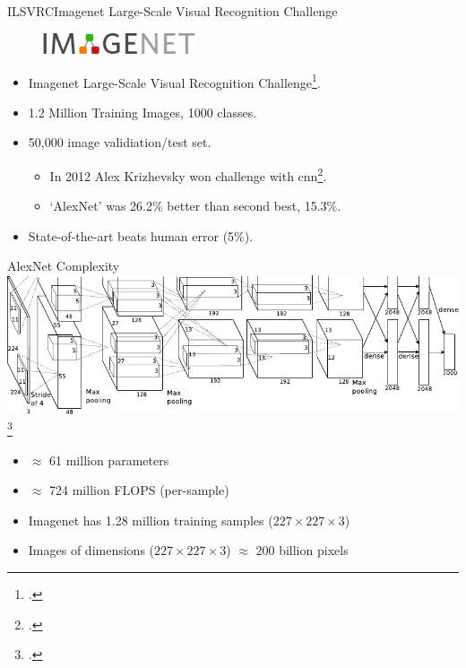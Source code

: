 \documentclass[t,xcolor=dvipsnames]{beamer}
\begin{document}
\begin{frame}{ILSVRC}{Imagenet Large-Scale Visual Recognition Challenge}

\begin{figure}
    \includegraphics[width=0.4\textwidth]{imagenetlogo}
\end{figure}
\begin{itemize}
    \item Imagenet Large-Scale Visual Recognition Challenge\footcite{ILSVRC2015}.
    \item 1.2 Million Training Images, 1000 classes.
    \item 50,000 image validiation/test set.
    \begin{itemize}
        \item In 2012 Alex Krizhevsky won challenge with \gls{cnn}\footcite{Krizhevsky2012}.
        \item `AlexNet' was 26.2\% better than second best, 15.3\%.
    \end{itemize}
    \item State-of-the-art beats human error (5\%).
\end{itemize}    
\end{frame}



\begin{frame}{AlexNet Complexity}
\includegraphics[width=\columnwidth]{alexnet}\footcite{Krizhevsky2012}
\begin{itemize}
\item $\approx$ 61 million parameters %
\item $\approx$ 724 million FLOPS (per-sample) %
\item Imagenet has 1.28 million training samples ($227 \times 227 \times 3$) %
\item Images of dimensions  ($227 \times 227 \times 3$) $\approx$ 200 billion pixels %
\end{itemize}
\end{frame}
\end{document}
